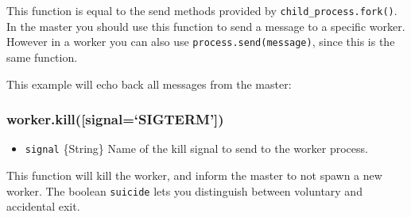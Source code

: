 This function is equal to the send methods provided by
\texttt{child\_process.fork()}. In the master you should use this
function to send a message to a specific worker. However in a worker you
can also use \texttt{process.send(message)}, since this is the same
function.

This example will echo back all messages from the master:

\begin{Shaded}
\begin{Highlighting}[]
 \NormalTok{(}\NormalTok{) \{}
   \NormalTok{();}
  \NormalTok{(}\NormalTok{);}

\NormalTok{\} }  \NormalTok{(}\NormalTok{) \{}
  \NormalTok{(}\NormalTok{, }
  \NormalTok{\});}
\NormalTok{\}}
\end{Highlighting}
\end{Shaded}

\subsubsection{worker.kill({[}signal=`SIGTERM'{]})}

\begin{itemize}
\item
  \texttt{signal} \{String\} Name of the kill signal to send to the
  worker process.
\end{itemize}

This function will kill the worker, and inform the master to not spawn a
new worker. The boolean \texttt{suicide} lets you distinguish between
voluntary and accidental exit.

\begin{Shaded}
\begin{Highlighting}[]
\NormalTok{(}\NormalTok{, }
   \NormalTok{(} \NormalTok{=== }\NormalTok{) \{}
    \NormalTok{(}
  \NormalTok{\}}
\NormalTok{\});}

\NormalTok{();}
\end{Highlighting}
\end{Shaded}

